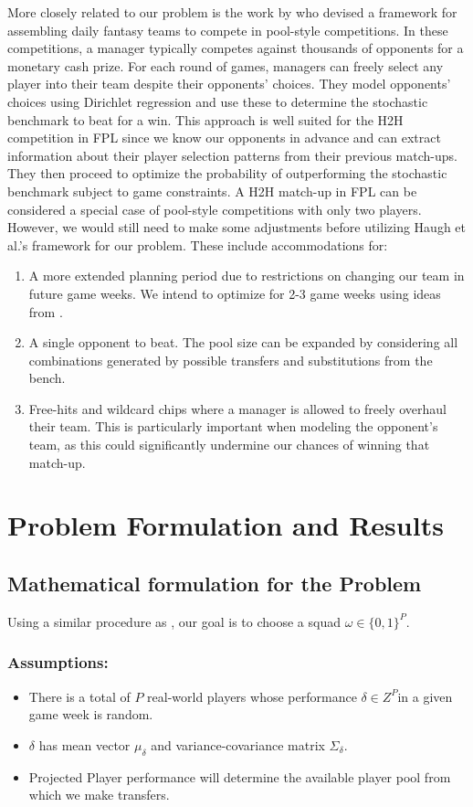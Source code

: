 \documentclass[12pt,oneside,a4paper]{book}
\theoremstyle{definition}
\theoremstyle{remark}
\begin{document}
			More closely related to our problem is the work by \cite{haugh2021play} who devised a framework for assembling daily fantasy teams to compete in pool-style competitions. In these competitions, a manager typically competes against thousands of opponents for a monetary cash prize. For each round of games, managers can freely select any player into their team despite their opponents’ choices. They model opponents’ choices using Dirichlet regression and use these to determine the stochastic benchmark to beat for a win. This approach is well suited for the H2H competition in FPL since we know our opponents in advance and can extract information about their player selection patterns from their previous match-ups. They then proceed to optimize the probability of outperforming the stochastic benchmark subject to game constraints. A H2H match-up in FPL can be considered a special case of pool-style competitions with only two players. However, we would still need to make some adjustments before utilizing Haugh et al.’s framework for our problem. These include accommodations for:
			\begin{enumerate}
				\item[-] A more extended planning period due to restrictions on changing our team in future game weeks. We intend to optimize for 2-3 game weeks using ideas from  \cite{becker2016analytical}.
				\item[-] A single opponent to beat. The pool size can be expanded by considering all combinations generated by possible transfers and substitutions from the bench.
				\item[-] Free-hits and wildcard chips where a manager is allowed to freely overhaul their team. This is particularly important when modeling the opponent’s team, as this could significantly undermine our chances of winning that match-up.
			\end{enumerate}

		\chapter{Problem Formulation and Results}
			\section{Mathematical formulation for the Problem}
			Using a similar procedure as \cite{haugh2021play}, our goal is to choose a squad   $\omega \in \{0,1\}^P$.

				\subsection{Assumptions:}
					\begin{itemize}
						\item There is a total of $P$ real-world players whose performance   $\delta \in Z^P$in a given game week is random.
						\item $\delta$ has mean vector $\mu_{\delta}$ and variance-covariance matrix $\Sigma_{\delta}$.
						\item Projected Player performance will determine the available player pool from which we make transfers.
					\end{itemize}
\end{document}
